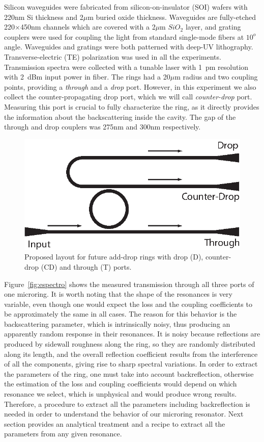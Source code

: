 \documentclass[10pt,letterpaper]{article}
\begin{document}
Silicon waveguides were fabricated from silicon-on-insulator (SOI) wafers with 220nm Si thickness and 2$\mu$m buried oxide thickness. Waveguides are fully-etched 220$\times$450nm channels which are covered with a 2$\mu$m $SiO_2$ layer, and grating couplers were used for coupling the light from standard single-mode fibers at $10^o$ angle. Waveguides and gratings were both patterned with deep-UV lithography. Transverse-electric (TE) polarization was used in all the experiments. Transmission spectra were collected with a tunable laser with 1~pm resolution with 2~dBm input power in fiber. The rings had a 20$\mu$m radius and two coupling points, providing a \emph{through} and a  \emph{drop} port. However, in this experiment we also collect the counter-propagating drop port, which we will call \emph{counter-drop} port. Measuring this port is crucial to fully characterize the ring, as it directly provides the information about the backscattering inside the cavity. The gap of the through and drop couplers was 275nm and 300nm respectively. 
\begin{figure}[!t]
    \centering
    \includegraphics[scale=1.]{add_drop_ring_new.eps}
    \caption{Proposed layout for future add-drop rings with drop (D), counter-drop (CD) and through (T) ports.}
    \label{fig:add_drop_ring}
\end{figure}

Figure~\ref{fig:espectro} shows the measured transmission through all three ports of one microring. It is worth noting that the shape of the resonances is very variable, even though one would expect the loss and the coupling coefficients to be approximately the same in all cases. The reason for this behavior is the backscattering parameter, which is intrinsically noisy, thus producing an apparently random response in their resonances. It is noisy because reflections are produced by sidewall roughness along the ring, so they are randomly distributed along its length, and the overall reflection coefficient results from the interference of all the components, giving rise to sharp spectral variations. In order to extract the parameters of the ring, one must take into account backreflection, otherwise the estimation of the loss and coupling coefficients would depend on which resonance we select, which is unphysical and would produce wrong results. Therefore, a procedure to extract all the parameters including backreflection is needed in order to understand the behavior of our microring resonator. Next section provides an analytical treatment and a recipe to extract all the parameters from any given resonance.
\end{document}
